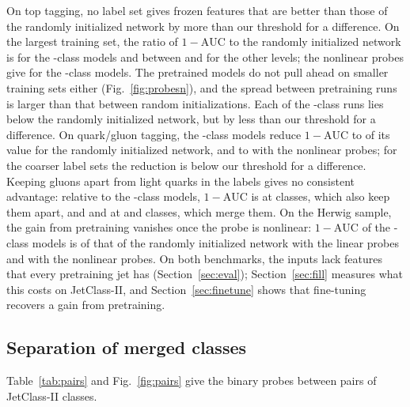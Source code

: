 \documentclass[11pt]{article}
\newcommand{\Kfull}{\VocabSizeLoneeighteight}
\newcommand{\Kres}{\VocabSizeLonesixtwo}
\newcommand{\Kmid}{\VocabSizeRfourtwoQone}
\newcommand{\Kcoarse}{\VocabSizeRonesixQone}
\newcommand{\oma}{\ensuremath{1-\mathrm{AUC}}}
\begin{document}
On top tagging, no label set gives frozen features that are better than those of the randomly
initialized network by more than our threshold for a difference. On the largest training
set, the ratio of $\oma$ to the randomly initialized network is \MlstCmpTopFullOverInit{} for
the \Kfull-class models and between \MlstCmpTopResOverInit{} and \MlstCmpTopMidOverInit{} for
the other levels; the nonlinear probes give \MlstMlpCmpTopFullOverInit{} for the \Kfull-class
models. The pretrained models do not pull ahead on smaller training sets either
(Fig.~\ref{fig:probesn}), and the spread between pretraining runs is larger than that between
random initializations. Each of the \Kres-class runs lies below the randomly initialized
network, but by less than our threshold for a difference. On quark/gluon tagging, the
\Kfull-class models reduce $\oma$ to \MlstCmpQgFullOverInit{} of its value for the randomly
initialized network, and to \MlstMlpCmpQgFullOverInit{} with the nonlinear probes; for the
coarser label sets the reduction is below our threshold for a difference. Keeping gluons apart
from light quarks in the labels gives no consistent advantage: relative to the \Kfull-class
models, $\oma$ is \MlstCmpQgResOverFull{} at \Kres{} classes, which also keep them apart, and
\MlstCmpQgMidOverFull{} and \MlstCmpQgCoarseOverFull{} at \Kmid{} and \Kcoarse{} classes, which
merge them. On the Herwig sample, the gain from pretraining vanishes once the probe is
nonlinear: $\oma$ of the \Kfull-class models is \MlstCmpQgHerwigFullOverInit{} of that of the
randomly initialized network with the linear probes and \MlstMlpCmpQgHerwigFullOverInit{} with
the nonlinear probes. On both benchmarks, the inputs lack features that every pretraining jet
has (Section~\ref{sec:eval}); Section~\ref{sec:fill} measures what this costs on JetClass-II,
and Section~\ref{sec:finetune} shows that fine-tuning recovers a gain from pretraining.

\subsection{Separation of merged classes}\label{sec:merge}

Table~\ref{tab:pairs} and Fig.~\ref{fig:pairs} give the binary probes between pairs of
JetClass-II classes.
\end{document}
